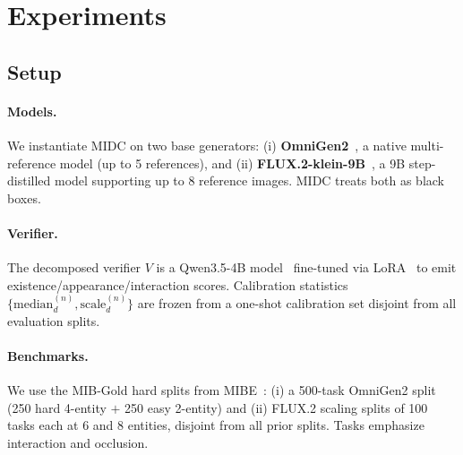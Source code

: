 \documentclass[letterpaper]{article}
\begin{document}
\section{Experiments}

\subsection{Setup}

\paragraph{Models.} We instantiate MIDC on two base generators: (i) \textbf{OmniGen2}~\citep{wu2025omnigen2}, a native multi-reference model (up to 5 references), and (ii) \textbf{FLUX.2-klein-9B}~\citep{blackforest2025flux2}, a 9B step-distilled model supporting up to 8 reference images. MIDC treats both as black boxes.

\paragraph{Verifier.} The decomposed verifier $V$ is a Qwen3.5-4B model~\citep{yang2024qwen2} fine-tuned via LoRA~\citep{hu2021lora,unsloth2024} to emit existence/appearance/interaction scores. Calibration statistics $\{\mathrm{median}_d^{(n)}, \mathrm{scale}_d^{(n)}\}$ are frozen from a one-shot calibration set disjoint from all evaluation splits.

\paragraph{Benchmarks.} We use the MIB-Gold hard splits from MIBE~\citep{anon2025mibe}: (i) a 500-task OmniGen2 split (250 hard 4-entity $+$ 250 easy 2-entity) and (ii) FLUX.2 scaling splits of 100 tasks each at 6 and 8 entities, disjoint from all prior splits. Tasks emphasize interaction and occlusion.
\end{document}
